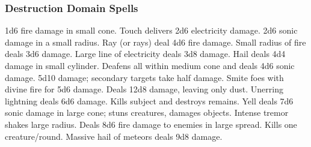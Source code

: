 \subsubsection{Destruction Domain Spells}

\begin{spelllist}
     1d6 fire damage in small cone.
     Touch delivers 2d6 electricity damage.
     2d6 sonic damage in a small radius.
     Ray (or rays) deal 4d6 fire damage.
     Small radius of fire deals 3d6 damage.
     Large line of electricity deals 3d8 damage.
     Hail deals 4d4 damage in small cylinder.
     Deafens all within medium cone and deals 4d6 sonic damage.
     5d10 damage; secondary targets take half damage.
     Smite foes with divine fire for 5d6 damage.
     Deals 12d8 damage, leaving only dust.
     Unerring lightning deals 6d6 damage.
    \F Kills subject and destroys remains.
     Yell deals 7d6 sonic damage in large cone; stuns creatures, damages objects.
     Intense tremor shakes large radius.
     Deals 8d6 fire damage to enemies in large spread.
     Kills one creature/round.
     Massive hail of meteors deals 9d8 damage.
\end{spelllist}

